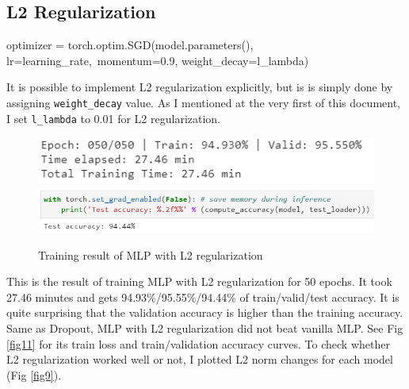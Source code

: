 \documentclass[11pt]{article}
\begin{document}
\subsection{L2 Regularization}
\begin{pythoncode*}{}
optimizer = torch.optim.SGD(model.parameters(), lr=learning_rate,\
                                momentum=0.9, weight_decay=l_lambda)
\end{pythoncode*}
    It is possible to implement L2 regularization explicitly, but is is simply done by assigning \texttt{weight\_decay} value. As I mentioned at the very first of this document, I set \texttt{l\_lambda} to 0.01 for L2 regularization.
    \begin{figure}[H]
        \includegraphics[width=0.8\linewidth]{img/L2/final.PNG}
        \includegraphics[width=1\linewidth]{img/L2/test.PNG}
        \caption{Training result of MLP with L2 regularization}
        \label{fig6}
    \end{figure}
    This is the result of training MLP with L2 regularization for 50 epochs. It took 27.46 minutes and gets 94.93\%/95.55\%/94.44\% of train/valid/test accuracy. It is quite surprising that the validation accuracy is higher than the training accuracy. Same as Dropout, MLP with L2 regularization did not beat vanilla MLP. See Fig \ref{fig11} for its train loss and train/validation accuracy curves. To check whether L2 regularization worked well or not, I plotted L2 norm changes for each model (Fig \ref{fig9}).
\end{document}
